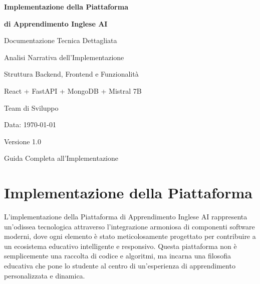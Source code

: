 \documentclass[a4paper, 14pt, oneside]{extbook}
\begin{document}
\begin{titlepage}
    \centering
    \vspace*{2cm}
    
    {\huge\bfseries Implementazione della Piattaforma\par}
    {\huge\bfseries di Apprendimento Inglese AI\par}
    
    \vspace{1.5cm}
    
    {\Large Documentazione Tecnica Dettagliata\par}
    {\Large Analisi Narrativa dell'Implementazione\par}
    
    \vspace{2cm}
    
    {\large Struttura Backend, Frontend e Funzionalità\par}
    {\large React + FastAPI + MongoDB + Mistral 7B\par}
    
    \vspace{3cm}
    
    {\large Team di Sviluppo\par}
    {\large Data: \today\par}
    
    \vfill
    
    {\large Versione 1.0\par}
    {\large Guida Completa all'Implementazione\par}
    
\end{titlepage}

\tableofcontents
\newpage

\chapter{Implementazione della Piattaforma}

L'implementazione della Piattaforma di Apprendimento Inglese AI rappresenta un'odissea tecnologica attraverso l'integrazione armoniosa di componenti software moderni, dove ogni elemento è stato meticolosamente progettato per contribuire a un ecosistema educativo intelligente e responsivo. Questa piattaforma non è semplicemente una raccolta di codice e algoritmi, ma incarna una filosofia educativa che pone lo studente al centro di un'esperienza di apprendimento personalizzata e dinamica.
\end{document}
